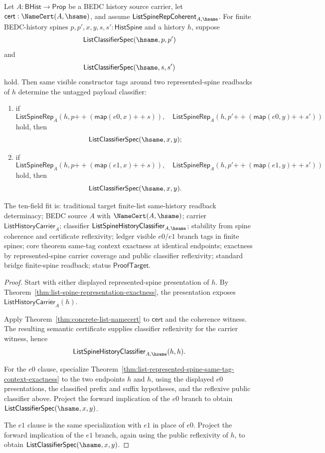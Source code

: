 \begin{theorem}
\label{thm:list-represented-spine-same-tag-payload-determinacy}
Let $A:\mathsf{BHist}\to\mathsf{Prop}$ be a BEDC history source carrier, let
$\mathsf{cert}:\NameCert(A,\hsame)$, and assume
$\mathsf{ListSpineRepCoherent}_{A,\hsame}$. For finite BEDC-history spines
$p,p',x,y,s,s':\mathsf{HistSpine}$ and a history $h$, suppose
$$
\mathsf{ListClassifierSpec}(\hsame,p,p')
$$
and
$$
\mathsf{ListClassifierSpec}(\hsame,s,s')
$$
hold. Then same visible constructor tags around two represented-spine readbacks
of $h$ determine the untagged payload classifier:
\begin{enumerate}
  \item if
  $$
  \mathsf{ListSpineRep}_A(h,p{++}(\mathsf{map}(e0,x){++}s)),
  \quad
  \mathsf{ListSpineRep}_A(h,p'{++}(\mathsf{map}(e0,y){++}s'))
  $$
  hold, then
  $$
  \mathsf{ListClassifierSpec}(\hsame,x,y);
  $$
  \item if
  $$
  \mathsf{ListSpineRep}_A(h,p{++}(\mathsf{map}(e1,x){++}s)),
  \quad
  \mathsf{ListSpineRep}_A(h,p'{++}(\mathsf{map}(e1,y){++}s'))
  $$
  hold, then
  $$
  \mathsf{ListClassifierSpec}(\hsame,x,y).
  $$
\end{enumerate}

The ten-field fit is: traditional target finite-list same-history readback
determinacy; BEDC source $A$ with $\NameCert(A,\hsame)$; carrier
$\mathsf{ListHistoryCarrier}_A$; classifier
$\mathsf{ListSpineHistoryClassifier}_{A,\hsame}$; stability from spine
coherence and certificate reflexivity; ledger visible $e0/e1$ branch tags in
finite spines; core theorem same-tag context exactness at identical endpoints;
exactness by represented-spine carrier coverage and public classifier
reflexivity; standard bridge finite-spine readback; status
$\mathsf{ProofTarget}$.
\end{theorem}
\begin{proof}
Start with either displayed represented-spine presentation of $h$. By
Theorem~\ref{thm:list-spine-representation-exactness}, the presentation exposes
$\mathsf{ListHistoryCarrier}_A(h)$.

Apply Theorem~\ref{thm:concrete-list-namecert} to $\mathsf{cert}$ and the
coherence witness. The resulting semantic certificate supplies classifier
reflexivity for the carrier witness, hence
$$
\mathsf{ListSpineHistoryClassifier}_{A,\hsame}(h,h).
$$

For the $e0$ clause, specialize
Theorem~\ref{thm:list-represented-spine-same-tag-context-exactness} to the two
endpoints $h$ and $h$, using the displayed $e0$ presentations, the classified
prefix and suffix hypotheses, and the reflexive public classifier above. Project
the forward implication of the $e0$ branch to obtain
$\mathsf{ListClassifierSpec}(\hsame,x,y)$.

The $e1$ clause is the same specialization with $e1$ in place of $e0$. Project
the forward implication of the $e1$ branch, again using the public reflexivity of
$h$, to obtain $\mathsf{ListClassifierSpec}(\hsame,x,y)$.
\end{proof}
